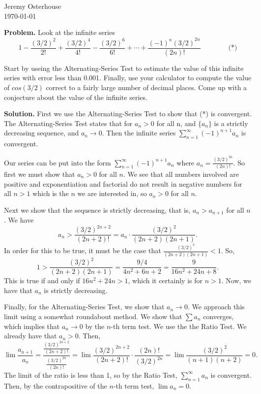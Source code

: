 \documentclass[12pt,letterpaper]{article}
\begin{document}
\begin{flushright}
\linespread{1}	%
\small \normalsize %
Jeremy Osterhouse \\
\today
\end{flushright}

{\bf Problem.} Look at the infinite series
\[
1 - \frac{{(3/2)}^2}{2!} + \frac{{(3/2)}^4}{4!} - \frac{{(3/2)}^6}{6!} + \cdots + \frac{{(-1)^n (3/2)}^{2n}}{(2n)!}\qquad\qquad\mbox{(*)}
\]

Start by useing the Alternating-Series Test to estimate the value of this infinite series with error less than 0.001. Finally, use your calculator to compute the value of $cos(3/2)$ correct to a fairly large number of decimal places. Come up with a conjecture about the value of the infinite series.

{\bf Solution.} First we use the Alternating-Series Test to show that (*) is convergent. The Alternating-Series Test states that for  $a_n > 0$ for all n, and  $\{a_n\}$ is a strictly decreasing sequence, and $a_n \rightarrow 0$. Then the infinite series $\sum_{n=1}^\infty (-1)^{n+1}a_n$ is convergent.

Our series can be put into the form $\sum_{n=1}^{\infty}(-1)^{n+1} a_n$ where $a_n = \frac{{(3/2)}^{2n}}{(2n)!}$. So first we must show that $a_n > 0$ for all $n$. We see that all numbers involved are positive and exponentiation and factorial do not result in negative numbers for all $n > 1$ which is the $n$ we are interested in, so $a_n > 0$ for all $n$. 

Next we show that the sequence is strictly decreasing, that is, $a_n > a_{n+1}$ for all $n$. We have
\[ 
a_n > \frac{{(3/2)}^{2n+2}}{(2n+2)!} = a_n\cdot\frac{(3/2)^2}{(2n+2)(2n+1)}.
\]
In order for this to be true, it must be the case that $\frac{(3/2)^2}{(2n+2)(2n+1)}<1$. So,
\[
1 > \frac{(3/2)^2}{(2n+2)(2n+1)} = \frac{9/4}{4n^2+6n+2} = \frac{9}{16n^2+24n+8}.
\]
This is true if and only if $16n^2+24n>1$, which it certainly is for $n>1$. Now, we have that $a_n$ is strictly decreasing.

Finally, for the Alternating-Series Test, we show that $a_n \rightarrow 0$.  We approach this limit using a somewhat roundabout method. We show that $\sum a_n$ converges, which implies that $a_n \rightarrow 0$ by the $n$-th term test. We use the the Ratio Test. We already have that $a_n>0$. Then,
\[
\lim \frac{a_{n+1}}{a_n} = \frac{\frac{{(3/2)}^{2n+2}}{(2n+2)!}}{\frac{{(3/2)}^{2n}}{(2n)!}} = 
\lim \frac{{(3/2)}^{2n+2}}{(2n+2)!} \cdot \frac{(2n)!}{{(3/2)}^{2n}} =
\lim \frac{(3/2)^2}{(n+1)(n+2)} = 0.
\]
The limit of the ratio is less than 1, so by the Ratio Test, $\sum_{n=1}^\infty a_n$ is convergent. Then, by the contrapositive of the $n$-th term test, $\lim a_n = 0$.
\end{document}
